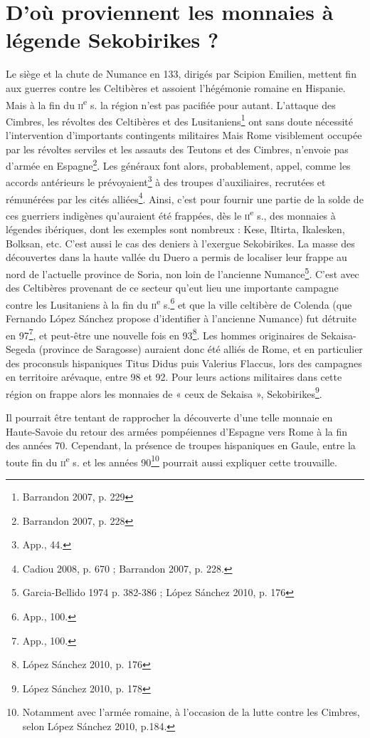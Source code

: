 \documentclass[a4paper,12pt]{article}
\begin{document}
\pagestyle{empty}
\section*{D’où proviennent les monnaies à légende Sekobirikes ?}

Le siège et la chute de Numance en 133, dirigés par Scipion Emilien, mettent fin aux guerres contre 
les Celtibères et assoient l’hégémonie romaine en Hispanie. Mais à la 
fin du \textsc{ii}\textsuperscript{e} s. la région n’est pas pacifiée pour autant.
L’attaque des Cimbres, les révoltes des Celtibères et des Lusitaniens\footnote{Barrandon 2007, p. 229} ont
sans doute nécessité l’intervention d’importants contingents militaires	
Mais Rome visiblement occupée par les révoltes serviles et les assauts des Teutons
et des Cimbres, n’envoie pas d’armée en Espagne\footnote{Barrandon 2007, p. 228}.
Les généraux font alors, probablement, appel, comme les accords antérieurs le prévoyaient\footnote{App., 44.}
à des troupes d’auxiliaires, recrutées et rémunérées par les cités alliées\footnote{Cadiou 2008, p. 670 ; Barrandon 2007, p. 228.
}.
Ainsi, c’est pour fournir une partie de la solde de ces guerriers indigènes qu’auraient été
frappées, dès le \textsc{ii}\textsuperscript{e} s., des monnaies à légendes ibériques, dont les exemples
sont nombreux : Kese, Iltirta, Ikalesken, Bolksan, etc. C’est aussi le cas des
deniers à l’exergue Sekobirikes. La masse des découvertes dans la haute
vallée du Duero a permis de localiser leur frappe au nord de l’actuelle province
de Soria, non loin de l’ancienne Numance\footnote{Garcia-Bellido 1974 p. 382-386 ; López Sánchez 2010, p. 176}.
C’est avec des Celtibères provenant
de ce secteur qu’eut lieu une importante campagne contre les Lusitaniens à
la fin du \textsc{ii}\textsuperscript{e} s.\footnote{App., 100.} et que la ville celtibère de Colenda (que Fernando López
Sánchez propose d’identifier à l’ancienne Numance) fut détruite en 97\footnote{App., 100.}, et
peut-être une nouvelle fois en 93\footnote{López Sánchez 2010, p. 176}.
Les hommes originaires de Sekaisa-Segeda (province de Saragosse) auraient donc été alliés de Rome, et en
particulier des proconsuls hispaniques Titus Didus puis Valerius Flaccus, lors
des campagnes en territoire arévaque, entre 98 et 92. Pour leurs actions
militaires dans cette région on frappe alors les monnaies de « ceux de Sekaisa »,
Sekobirikes\footnote{López Sánchez 2010, p. 178}.

Il pourrait être tentant de rapprocher la découverte d’une telle monnaie en
Haute-Savoie du retour des armées pompéiennes d’Espagne vers Rome à la
fin des années 70. Cependant, la présence de troupes hispaniques en Gaule,
entre la toute fin du \textsc{ii}\textsuperscript{e} s. et les années 90\footnote{Notamment avec l’armée romaine, à l’occasion de la lutte contre les Cimbres, selon López Sánchez 2010,
p.184.} pourrait aussi expliquer cette
trouvaille.
\end{document}

